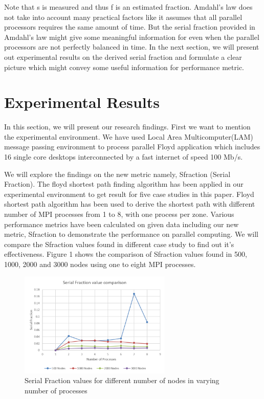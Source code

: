 Note that s is measured and thus f is an estimated fraction. Amdahl's law does not take into account many practical factors like it assumes that all parallel processors requires the same amount of time. But the serial fraction provided in Amdahl's law might give some meaningful information for even when the parallel processors are not perfectly balanced in time. In the next section, we will present out experimental results on the derived serial fraction and formulate a clear picture which might convey some useful information for performance metric.

\section{Experimental Results}
In this section, we will present our research findings. First we want to mention the experimental environment. We have used Local Area Multicomputer(LAM) message passing environment to process parallel Floyd application which includes 16 single core desktops interconnected by a fast internet of speed 100 Mb/s.

We will explore the findings on the new metric namely, Sfraction (Serial Fraction).  The floyd shortest path finding algorithm \cite{floyd} has been applied in our experimental environment to get result for five case studies in this paper. Floyd shortest path algorithm has been used to derive the shortest path with different number of MPI processes from 1 to 8, with one process per zone. Various performance metrics have been calculated on given data including our new metric, Sfraction to demonstrate the performance on parallel computing. We will compare the Sfraction values found in different case study to find out it's effectiveness. Figure 1 shows the comparison of Sfraction values found in 500, 1000, 2000 and 3000 nodes using one to eight MPI processes.

\begin{figure}
\begin{center}
  \includegraphics[height=5cm,width=\linewidth]{./image/comp.png}
\end{center}
  \caption{Serial Fraction values for different number of nodes in varying number of processes}
  \label{Fig 1:Serial Fraction Comparison}
\end{figure}



